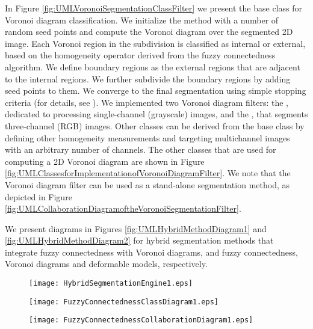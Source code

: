 In Figure \ref{fig:UMLVoronoiSegmentationClassFilter} we present the base class for
Voronoi diagram classification. We initialize the method with a number of random
seed points and compute the Voronoi diagram over the segmented 2D image. Each
Voronoi region in the subdivision is classified as internal or external,
based on the homogeneity operator derived from the fuzzy connectedness
algorithm.  We define boundary regions as the external regions that are
adjacent to the internal regions.  We further subdivide the boundary regions
by adding seed points to them. We converge to the final segmentation
using simple stopping criteria (for details, see \cite{Imielinska2001}). We
implemented two Voronoi diagram filters: the
, dedicated to processing single-channel
(grayscale) images, and the , that segments
three-channel (RGB) images. Other classes can be derived from the base class
by defining other homogeneity measurements and targeting multichannel images
with an arbitrary number of channels.  The other classes that are used for
computing a 2D Voronoi diagram are shown in Figure
\ref{fig:UMLClassesforImplementationofVoronoiDiagramFilter}. We note that the
Voronoi diagram filter can be used as a stand-alone segmentation method, as
depicted in Figure
\ref{fig:UMLCollaborationDiagramoftheVoronoiSegmentationFilter}.

 We present diagrams in Figures \ref{fig:UMLHybridMethodDiagram1} and 
 \ref{fig:UMLHybridMethodDiagram2} for hybrid segmentation methods
 that integrate fuzzy connectedness with Voronoi diagrams, and fuzzy
 connectedness, Voronoi diagrams and deformable models, respectively.


\begin{figure}
\center
\texttt{[image: HybridSegmentationEngine1.eps]}
\label{fig:ComponentsofaHybridSegmentationApproach}
\end{figure}


\begin{figure}
\center
\texttt{[image: FuzzyConnectednessClassDiagram1.eps]}
\label{fig:UMLClassDiagramoftherFuzzyConnectednessFilter}
\end{figure}


\begin{figure}
\center
\texttt{[image: FuzzyConnectednessCollaborationDiagram1.eps]}
\label{fig:UMLCollaborationDiagramoftheFuzzyConnectednessFilter}
\end{figure}

